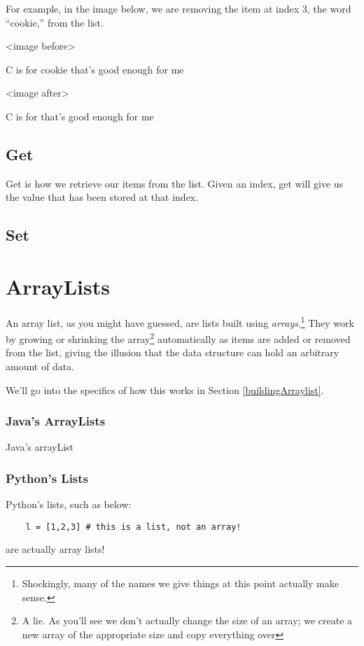 For example, in the image below, we are removing the item at index 3, the word ``cookie,'' from the list.


<image before>

C is for cookie that's good enough for me 

<image after>

C is for that's good enough for me 

\subsection{Get}

Get is how we retrieve our items from the list.  Given an index, get will give us the value that has been stored at that index.



\subsection{Set}

\section{ArrayLists}
An array list, as you might have guessed, are lists built using \textit{arrays}.\footnote{Shockingly, many of the names we give things at this point actually make sense.}
They work by growing or shrinking the array\footnote{A lie.  As you'll see we don't actually change the size of an array;  we create a new array of the appropriate size and copy everything over} automatically as items are added or removed from the list, giving the illusion that the data structure can hold an arbitrary amount of data.

We'll go into the specifics of how this works in Section \ref{buildingArraylist}.


\subsubsection{Java's ArrayLists}
Java's arrayList
\subsubsection{Python's Lists}
Python's lists, such as below:
\begin{verbatim}
	l = [1,2,3] # this is a list, not an array!	
\end{verbatim}
are actually array lists! %

